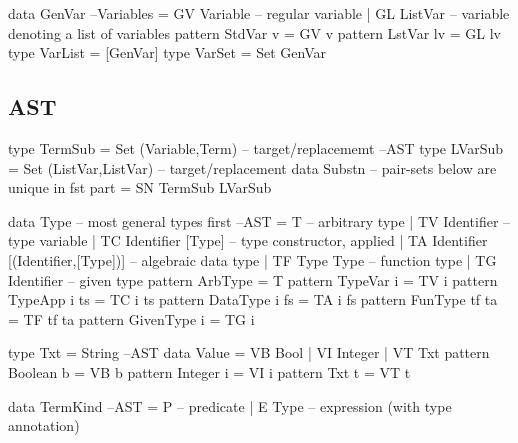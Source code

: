 \begin{code}
data GenVar                                                        --Variables
 = GV Variable -- regular variable
 | GL ListVar  -- variable denoting a list of variables
pattern StdVar v = GV v
pattern LstVar lv = GL lv
type VarList = [GenVar]
type VarSet = Set GenVar
\end{code}


\subsection{AST}

\begin{code}
type TermSub = Set (Variable,Term) -- target/replacememt                --AST
type LVarSub = Set (ListVar,ListVar) -- target/replacement
data Substn --  pair-sets below are unique in fst part
  = SN TermSub LVarSub
\end{code}

\begin{code}
data Type -- most general types first                                   --AST
 = T  -- arbitrary type
 | TV Identifier -- type variable
 | TC Identifier [Type] -- type constructor, applied
 | TA Identifier [(Identifier,[Type])] -- algebraic data type
 | TF Type Type -- function type
 | TG Identifier -- given type
pattern ArbType = T
pattern TypeVar i  = TV i
pattern TypeApp i ts = TC i ts
pattern DataType i fs = TA i fs
pattern FunType tf ta = TF tf ta
pattern GivenType i = TG i
\end{code}


\begin{code}
type Txt = String                                                        --AST
data Value
 = VB Bool
 | VI Integer
 | VT Txt
pattern Boolean b  =  VB b
pattern Integer i  =  VI i
pattern Txt     t  =  VT t
\end{code}

\begin{code}
data TermKind                                                            --AST
 = P -- predicate
 | E Type -- expression (with type annotation)
\end{code}

